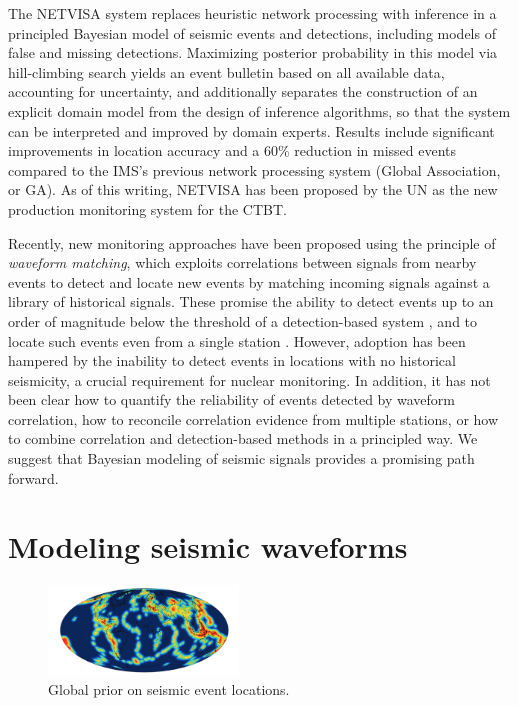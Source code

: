 \documentclass[twoside]{article} \usepackage{aistats2017}
\begin{document}
The NETVISA system \citep{arora2010global,arora2013net} replaces heuristic network
processing with inference in a principled Bayesian model of seismic
events and detections, including models of false and missing
detections. Maximizing posterior probability in this model via
hill-climbing search yields an event bulletin based on all available
data, accounting for uncertainty, and additionally separates
the construction of an explicit domain model from the design of
inference algorithms, so that the system can be interpreted and
improved by domain experts. Results include significant improvements
in location accuracy and a 60\% reduction in missed events compared to
the IMS's previous network processing system (Global
Association, or GA). As of this
writing, NETVISA has been proposed by the UN as the new production monitoring
system for the CTBT.

Recently, new monitoring approaches have been proposed using the
principle of {\em waveform matching}, which exploits correlations
between signals from nearby events to detect and
locate new events by matching incoming signals against a library of
historical signals. These promise the ability
to detect events up to an order of magnitude below the threshold of a
detection-based system \citep{gibbons2006detection,schaff2010one}, and
to locate such events even from a single station
\citep{schaff2012seismological}. However, adoption has been hampered by the inability to detect
events in locations with no historical seismicity, a crucial requirement
for nuclear monitoring. In addition, it has not been clear how to quantify
the reliability of events detected by waveform correlation, how to
reconcile correlation evidence from multiple stations,
or how to combine correlation and detection-based
methods in a principled way. We suggest that 
Bayesian modeling of seismic signals provides a promising path
forward. 

\section{Modeling seismic waveforms}

\begin{figure}
\centering
    \includegraphics[width=0.45\textwidth]{world_ev_prior}
    \caption{Global prior on seismic event locations.}
\label{fig:global_prior}
\end{figure}
\end{document}
